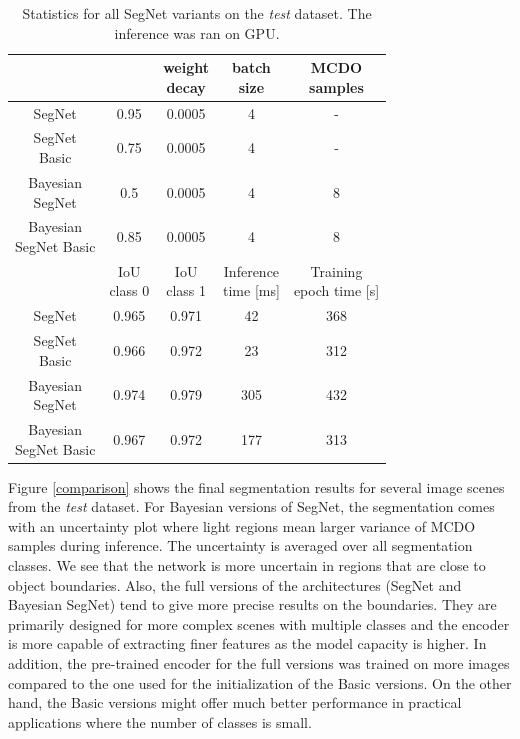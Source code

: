 \renewcommand{\arraystretch}{1.1}
\begin{table}[h]
	\centering	
	\begin{tabular}{|c|c|c|c|c|}
		\hline
		\thead{Architecture} & \thead{base\_lr} & \thead{weight \\ decay} & \thead{batch \\ size} & \thead{MCDO \\ samples}\\		
		\hline
		SegNet & 0.95 & 0.0005 & 4 & - \\
		\hline
		\makecell{SegNet \\ Basic} & 0.75 & 0.0005 & 4 & - \\
		\hline
		\makecell{Bayesian \\ SegNet} & 0.5 & 0.0005 & 4 & 8 \\	
		\hline
		\makecell{Bayesian \\ SegNet Basic} & 0.85 & 0.0005 & 4 & 8 \\
		\hline
		& \thead{IoU \\ class 0} & \thead{IoU \\ class 1} & \thead{Inference \\ time [ms] } & \thead{Training \\ epoch time [s] }\\		
		\hline	
		SegNet & 0.965 & 0.971 & 42 & 368 \\	
		\hline	
		\makecell{SegNet \\ Basic} & 0.966 & 0.972 & 23 & 312 \\	
		\hline	
		\makecell{Bayesian \\ SegNet} & 0.974 & 0.979 & 305 & 432 \\	
		\hline	
		\makecell{Bayesian \\ SegNet Basic} & 0.967 & 0.972 & 177 & 313 \\
		\hline
	\end{tabular}
	\vspace{10mm}
	\caption{Statistics for all SegNet variants on the \textit{test} dataset. The inference was ran on GPU.} 
	\label{tabulka}
\end{table}

Figure \ref{comparison} shows the final segmentation results for several image scenes from the \textit{test} dataset. For Bayesian versions of SegNet, the segmentation comes with an uncertainty plot where light regions mean larger variance of MCDO samples during inference. The uncertainty is averaged over all segmentation classes. We see that the network is more uncertain in regions that are close to object boundaries. Also, the full versions of the architectures (SegNet and Bayesian SegNet) tend to give more precise results on the boundaries. They are primarily designed for more complex scenes with multiple classes and the encoder is more capable of extracting finer features as the model capacity is higher. In addition, the pre-trained encoder for the full versions was trained on more images compared to the one used for the initialization of the Basic versions. On the other hand, the Basic versions might offer much better performance in practical applications where the number of classes is small.

